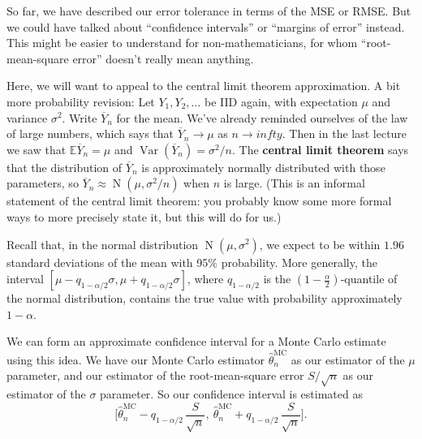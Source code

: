 \documentclass[
  letterpaper,
  DIV=11,
  numbers=noendperiod]{scrreprt}
\newcommand{\Var}{\operatorname{Var}}
\theoremstyle{plain}
\theoremstyle{definition}
\theoremstyle{definition}
\theoremstyle{remark}
\begin{document}
So far, we have described our error tolerance in terms of the MSE or
RMSE. But we could have talked about ``confidence intervals'' or
``margins of error'' instead. This might be easier to understand for
non-mathematicians, for whom ``root-mean-square error'' doesn't really
mean anything.

Here, we will want to appeal to the central limit theorem approximation.
A bit more probability revision: Let \(Y_1, Y_2, \dots\) be IID again,
with expectation \(\mu\) and variance \(\sigma^2\). Write
\(\overline Y_n\) for the mean. We've already reminded ourselves of the
law of large numbers, which says that \(\overline Y_n \to \mu\) as
\(n \to infty\). Then in the last lecture we saw that
\(\mathbb E \overline Y_n = \mu\) and
\(\Var(\overline{Y}_n) = \sigma^2/n\). The \textbf{central limit
theorem} says that the distribution of \(\overline Y_n\) is
approximately normally distributed with those parameters, so
\(\overline Y_n \approx \operatorname{N}(\mu, \sigma^2/n)\) when \(n\)
is large. (This is an informal statement of the central limit theorem:
you probably know some more formal ways to more precisely state it, but
this will do for us.)

Recall that, in the normal distribution
\(\operatorname{N}(\mu, \sigma^2)\), we expect to be within \(1.96\)
standard deviations of the mean with 95\% probability. More generally,
the interval
\([\mu - q_{1-\alpha/2}\sigma, \mu + q_{1-\alpha/2}\sigma]\), where
\(q_{1-\alpha/2}\) is the \((1- \frac{\alpha}{2})\)-quantile of the
normal distribution, contains the true value with probability
approximately \(1 - \alpha\).

We can form an approximate confidence interval for a Monte Carlo
estimate using this idea. We have our Monte Carlo estimator
\(\widehat{\theta}_n^\mathrm{MC}\) as our estimator of the \(\mu\)
parameter, and our estimator of the root-mean-square error
\(S/\sqrt{n}\) as our estimator of the \(\sigma\) parameter. So our
confidence interval is estimated as
\[\bigg[ \widehat{\theta}_n^\mathrm{MC} - q_{1-\alpha/2}\,\frac{S}{\sqrt{n}}, \ \widehat{\theta}_n^\mathrm{MC} + q_{1-\alpha/2}\,\frac{S}{\sqrt{n}} \bigg] . \]
\end{document}

